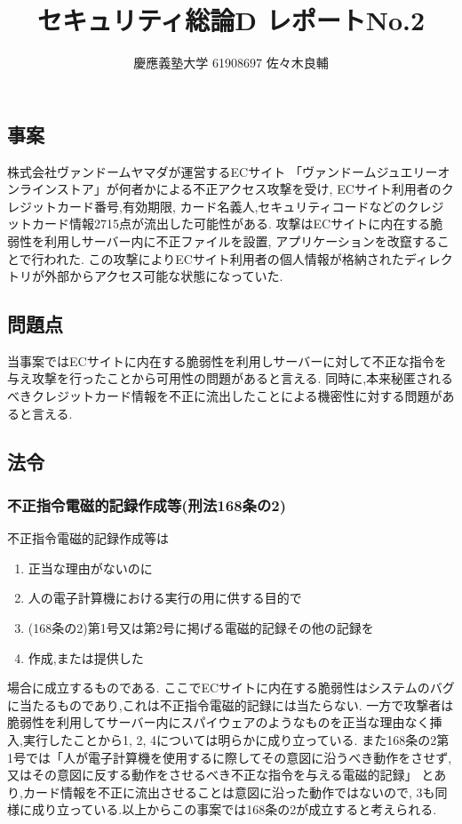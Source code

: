 \documentclass[uplatex,a4j,11pt,dvipdfmx]{jsarticle}
\begin{document}
\title{セキュリティ総論D レポートNo.2}
\author{慶應義塾大学 61908697 佐々木良輔}
\date{}
\maketitle
\subsection*{事案}
株式会社ヴァンドームヤマダが運営するECサイト
「ヴァンドームジュエリーオンラインストア」が何者かによる不正アクセス攻撃を受け,
ECサイト利用者のクレジットカード番号,有効期限,
カード名義人,セキュリティコードなどのクレジットカード情報2715点が流出した可能性がある.
攻撃はECサイトに内在する脆弱性を利用しサーバー内に不正ファイルを設置,
アプリケーションを改竄することで行われた.
この攻撃によりECサイト利用者の個人情報が格納されたディレクトリが外部からアクセス可能な状態になっていた.\cite{vendome:online}
\subsection*{問題点}
当事案ではECサイトに内在する脆弱性を利用しサーバーに対して不正な指令を与え攻撃を行ったことから可用性の問題があると言える.
同時に,本来秘匿されるべきクレジットカード情報を不正に流出したことによる機密性に対する問題があると言える.
\subsection*{法令}
\subsubsection*{不正指令電磁的記録作成等(刑法168条の2)}
不正指令電磁的記録作成等は
\begin{enumerate}
  \item 正当な理由がないのに
  \item 人の電子計算機における実行の用に供する目的で
  \item (168条の2)第1号又は第2号に掲げる電磁的記録その他の記録を
  \item 作成,または提供した 
\end{enumerate}
場合に成立するものである.\cite{5461726F7:online}
ここでECサイトに内在する脆弱性はシステムのバグに当たるものであり,これは不正指令電磁的記録には当たらない.\cite{5461726F7:online}
一方で攻撃者は脆弱性を利用してサーバー内にスパイウェアのようなものを正当な理由なく挿入,実行したことから1, 2, 4については明らかに成り立っている.
また168条の2第1号では「人が電子計算機を使用するに際してその意図に沿うべき動作をさせず,又はその意図に反する動作をさせるべき不正な指令を与える電磁的記録」
とあり,カード情報を不正に流出させることは意図に沿った動作ではないので,
3も同様に成り立っている.以上からこの事案では168条の2が成立すると考えられる.
\end{document}

